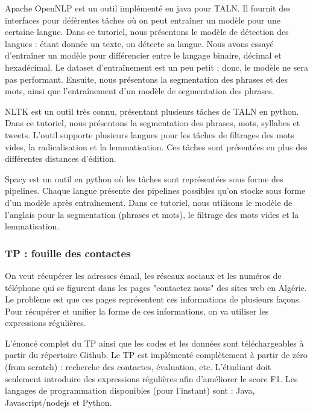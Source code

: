 \documentclass{KodeBook}
\begin{document}
Apache OpenNLP est un outil implémenté en java pour TALN.
Il fournit des interfaces pour déférentes tâches où on peut entraîner un modèle pour une certaine langue.
Dans ce tutoriel, nous présentons le modèle de détection des langues : étant donnée un texte, on détecte sa langue.
Nous avons essayé d'entraîner un modèle pour différencier entre le langage binaire, décimal et hexadécimal. 
Le dataset d'entraînement est un peu petit ; donc, le modèle ne sera pas performant.
Ensuite, nous présentons la segmentation des phrases et des mots, ainsi que l'entraînement d'un modèle de segmentation des phrases.

NLTK est un outil très connu, présentant plusieurs tâches de TALN en python.
Dans ce tutoriel, nous présentons la segmentation des phrases, mots, syllabes et tweets.
L'outil supporte plusieurs langues pour les tâches de filtrages des mots vides, la radicalisation  et la lemmatisation. 
Ces tâches sont présentées en plus des différentes distances d'édition.


Spacy est un outil en python où les tâches sont représentées sous forme des pipelines.
Chaque langue présente des pipelines possibles qu'on stocke sous forme d'un modèle après entraînement.
Dans ce tutoriel, nous utilisons le modèle de l'anglais pour la segmentation (phrases et mots), le filtrage des mots vides et la lemmatisation.



\subsubsection*{TP : fouille des contactes}

On veut récupérer les adresses émail, les réseaux sociaux et les numéros de téléphone qui se figurent dans les pages "contactez nous" des sites web en Algérie. 
Le problème est que ces pages représentent ces informations de plusieurs façons.
Pour récupérer et unifier la forme de ces informations, on va utiliser les expressions régulières. 

L'énoncé complet du TP ainsi que les codes et les données sont téléchargeables à partir du répertoire Github.
Le TP est implémenté complètement à partir de zéro (from scratch) : recherche des contactes, évaluation, etc. 
L'étudiant doit seulement introduire des expressions régulières afin d'améliorer le score F1.
Les langages de programmation disponibles (pour l'instant) sont : Java, Javascript/nodejs et Python.



\ifx\wholebook\relax\else
% 
% 
	
\end{document}
